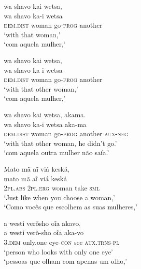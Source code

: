 \documentclass[output=paper,
modfonts,nonflat
]{langsci/langscibook}
\begin{document}
\ea wa shavo kai wetsa, \\[.3em]
\gll wa                shavo ka-i             wetsa   \\
     \textsc{dem.dist} woman go-\textsc{prog} another \\
\glt `with that woman,' \\
`com aquela mulher,' \\
\z

\ea wa shavo kai wetsa, \\[.3em]
\gll wa                shavo ka-i             wetsa   \\
     \textsc{dem.dist} woman go-\textsc{prog} another \\
\glt `with that other woman,' \\
`com aquela mulher,' \\
\z

\ea wa shavo kai wetsa, akama. \\[.3em]
\gll wa                shavo ka-i             wetsa   aka-ma           \\
     \textsc{dem.dist} woman go-\textsc{prog} another \textsc{aux-neg} \\
\glt `with that other woman, he didn't go.' \\
`com aquela outra mulher não saía.' \\
\z

\ea Mato mã aĩ viá keská, \\[.3em]
\gll mato            mã       aĩ    viá  keská        \\
     2\textsc{pl.abs} \textsc{2pl.erg} woman take \textsc{sml} \\
\glt `Just like when you choose a woman,'\footnotemark \\
`Como vocês que escolhem as suas mulheres,' \\
\z


\ea a westí verõsho oĩa akavo, \\[.3em]
\gll a              westí    verõ-sho         oĩa aka-vo               \\
     3.\textsc{dem} only.one eye-\textsc{con} see \textsc{aux.trns-pl} \\
\glt `person who looks with only one eye'\footnotemark{} \\
`pessoas que olham com apenas um olho,' \\
\z
\end{document}
